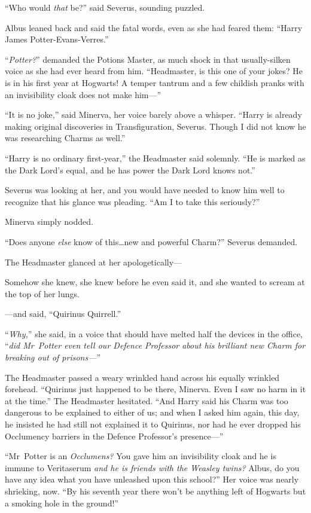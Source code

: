 “Who would \emph{that} be?” said Severus, sounding puzzled.

Albus leaned back and said the fatal words, even as she had feared them:
“Harry James Potter-Evans-Verres.”

“\emph{Potter?}” demanded the Potions Master, as much shock in that usually-silken voice as she had ever heard from him.
“Headmaster, is this one of your jokes? He is in his first year at Hogwarts! A temper tantrum and a few childish pranks with an invisibility cloak does not make him—”

“It is no joke,” said Minerva, her voice barely above a whisper.
“Harry is already making original discoveries in Transfiguration, Severus. Though I did not know he was researching Charms as well.”

“Harry is no ordinary first-year,” the Headmaster said solemnly.
“He is marked as the Dark Lord’s equal, and he has power the Dark Lord knows not.”

Severus was looking at her, and you would have needed to know him well to recognize that his glance was pleading.
“Am I to take this seriously?”

Minerva simply nodded.

“Does anyone \emph{else} know of this…new and powerful Charm?” Severus demanded.

The Headmaster glanced at her apologetically—

Somehow she knew, she knew before he even said it, and she wanted to scream at the top of her lungs.

—and said,
“Quirinus Quirrell.”

“\emph{Why,}” she said, in a voice that should have melted half the devices in the office, “\emph{did Mr~Potter even \emph{tell} our Defence Professor about his brilliant new Charm for breaking out of prisons—}”

The Headmaster passed a weary wrinkled hand across his equally wrinkled forehead.
“Quirinus just happened to be there, Minerva. Even I saw no harm in it at the time.” The Headmaster hesitated.
“And Harry said his Charm was too dangerous to be explained to either of us; and when I asked him again, this day, he insisted he had still not explained it to Quirinus, nor had he ever dropped his Occlumency barriers in the Defence Professor’s presence—”

“Mr~Potter is an \emph{Occlumens?} You gave him an invisibility cloak and he is immune to Veritaserum \emph{and he is friends with the Weasley twins?} Albus, do you have any idea what you have unleashed upon this school?” Her voice was nearly shrieking, now.
“By his seventh year there won’t be anything left of Hogwarts but a smoking hole in the ground!”

